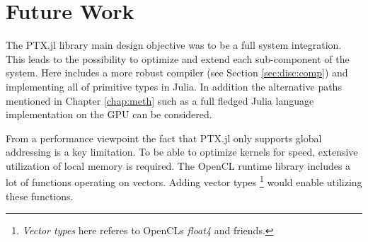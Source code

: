 \chapter{Future Work}

The PTX.jl library main design objective was to be a full system
integration. This leads to the possibility to optimize and extend each
sub-component of the system. Here includes a more robust compiler (see
Section \ref{sec:disc:comp}) and implementing all of primitive types
in Julia. In addition the alternative paths mentioned in Chapter
\ref{chap:meth} such as a full fledged Julia language implementation on
the GPU can be considered.

From a performance viewpoint the fact that PTX.jl only supports global
addressing is a key limitation. To be able to optimize kernels for
speed, extensive utilization of local memory is required. The OpenCL
runtime library includes a lot of functions operating on
vectors. Adding vector types \footnote{\textit{Vector types} here referes to
  OpenCLs \textit{float4} and friends.} would enable utilizing these
functions.
